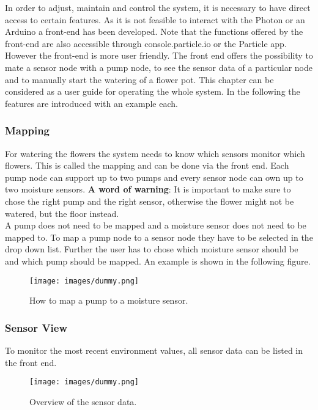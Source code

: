 In order to adjust, maintain and control the system, it is necessary to have direct access to certain features. As it is not feasible to interact with the Photon or an Arduino a front-end has been developed. Note that the functions offered by the front-end are also accessible through console.particle.io or the Particle app. However the front-end is more user friendly. The front end offers the possibility to mate a sensor node with a pump node, to see the sensor data of a particular node and to manually start the watering of a flower pot.
This chapter can be considered as a user guide for operating the whole system.
In the following the features are introduced with an example each.

\subsubsection{Mapping}
For watering the flowers the system needs to know which sensors monitor which flowers. This is called the mapping and can be done via the front end.
Each pump node can support up to two pumps and every sensor node can own up to two moisture sensors. \textbf{A word of warning}: It is important to make sure to chose the right pump and the right sensor, otherwise the flower might not be watered, but the floor instead.\\
A pump does not need to be mapped and a moisture sensor does not need to be mapped to.
To map a pump node to a sensor node they have to be selected in the drop down list. Further the user has to chose which moisture sensor should be and which pump should be mapped. An example is shown in the following figure.

\begin{figure}[h!]
	\begin{center}
	\texttt{[image: images/dummy.png]}
	\caption{How to map a pump to a moisture sensor.}
	\label{fig:mapping}
	\end{center}
\end{figure}


\subsubsection{Sensor View}
To monitor the most recent environment values, all sensor data can be listed in the front end.

\begin{figure}[h!]
	\begin{center}
	\texttt{[image: images/dummy.png]}
	\caption{Overview of the sensor data.}
	\label{fig:sensor_overview}
	\end{center}
\end{figure}

